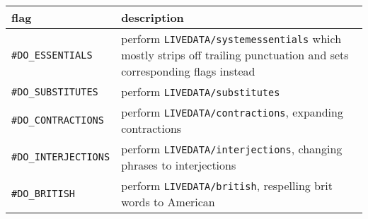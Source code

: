 \documentclass[]{article}
\begin{document}
\begin{longtable}[]{@{}ll@{}}
\toprule
\begin{minipage}[b]{0.31\columnwidth}\raggedright\strut
flag\strut
\end{minipage} & \begin{minipage}[b]{0.63\columnwidth}\raggedright\strut
description\strut
\end{minipage}\tabularnewline
\midrule
\endhead
\begin{minipage}[t]{0.31\columnwidth}\raggedright\strut
\texttt{\#DO\_ESSENTIALS}\strut
\end{minipage} & \begin{minipage}[t]{0.63\columnwidth}\raggedright\strut
perform \texttt{LIVEDATA/systemessentials} which mostly strips off
trailing punctuation and sets corresponding flags instead\strut
\end{minipage}\tabularnewline
\begin{minipage}[t]{0.31\columnwidth}\raggedright\strut
\texttt{\#DO\_SUBSTITUTES}\strut
\end{minipage} & \begin{minipage}[t]{0.63\columnwidth}\raggedright\strut
perform \texttt{LIVEDATA/substitutes}\strut
\end{minipage}\tabularnewline
\begin{minipage}[t]{0.31\columnwidth}\raggedright\strut
\texttt{\#DO\_CONTRACTIONS}\strut
\end{minipage} & \begin{minipage}[t]{0.63\columnwidth}\raggedright\strut
perform \texttt{LIVEDATA/contractions}, expanding contractions\strut
\end{minipage}\tabularnewline
\begin{minipage}[t]{0.31\columnwidth}\raggedright\strut
\texttt{\#DO\_INTERJECTIONS}\strut
\end{minipage} & \begin{minipage}[t]{0.63\columnwidth}\raggedright\strut
perform \texttt{LIVEDATA/interjections}, changing phrases to
interjections\strut
\end{minipage}\tabularnewline
\begin{minipage}[t]{0.31\columnwidth}\raggedright\strut
\texttt{\#DO\_BRITISH}\strut
\end{minipage} & \begin{minipage}[t]{0.63\columnwidth}\raggedright\strut
perform \texttt{LIVEDATA/british}, respelling brit words to
American\strut
\end{minipage}\tabularnewline

\end{longtable}
\end{document}
